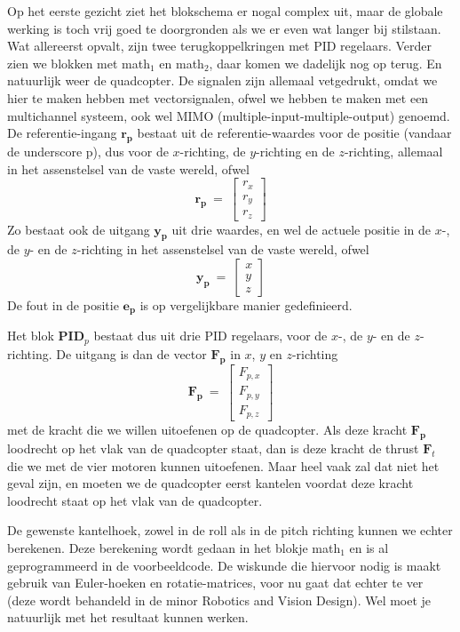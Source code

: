 \documentclass[a4paper,11pt]{article}
\begin{document}
Op het eerste gezicht ziet het blokschema er
nogal complex uit, maar de globale werking is toch vrij goed te doorgronden als
we er even wat langer bij stilstaan.
Wat allereerst opvalt, zijn twee terugkoppelkringen met
PID regelaars. Verder zien we blokken met math$_1$  en math$_2$, daar komen we
dadelijk nog op terug. En natuurlijk
weer de quadcopter.
De signalen zijn allemaal vetgedrukt, omdat we hier te maken hebben met
vectorsignalen, ofwel we hebben te maken met een multichannel systeem, ook wel
MIMO (multiple-input-multiple-output) genoemd. De referentie-ingang
$\mathbf{r_p}$  bestaat uit de referentie-waardes voor de positie (vandaar de
underscore p), dus voor de $x$-richting, de
$y$-richting en de $z$-richting, allemaal in het assenstelsel van de vaste
wereld, ofwel
\[
\mathbf{r_p} ~= ~ \left[\begin{array}{c}r_x\\ r_y \\ r_z\end{array}\right]
\]
Zo bestaat ook de uitgang $\mathbf{y_p}$ uit drie waardes, en wel de actuele
positie in de $x$-, de $y$- en de $z$-richting in het assenstelsel van de
vaste wereld, ofwel
\[
\mathbf{y_p}~ = ~ \left[\begin{array}{c}x\\y\\z\end{array}\right]
  \]
  De fout in de positie $\mathbf{e_p}$ is op vergelijkbare manier
  gedefinieerd. 
  
  Het blok \textbf{PID$_p$} bestaat dus uit drie PID regelaars,
  voor de $x$-, de $y$- en de $z$-richting. De uitgang is dan de vector
  $\mathbf{F_p}$ in $x$, $y$ en $z$-richting
  \[
  \mathbf{F_p}~ = ~ \left[\begin{array}{c}F_{p,x}\\ F_{p,y} \\ F_{p,z}\end{array}\right]
  \]
  met de kracht die we willen uitoefenen op de quadcopter. Als deze kracht
  $\mathbf{F_p}$ 
  loodrecht op het vlak van de quadcopter staat, dan is deze kracht de thrust
  $\mathbf{F}_t$ die we met de vier motoren kunnen uitoefenen. Maar heel vaak
  zal dat niet het geval zijn, en moeten we de quadcopter eerst kantelen
  voordat deze kracht loodrecht staat op het vlak van de quadcopter.

  De gewenste kantelhoek, zowel in de roll als in de pitch richting kunnen we
  echter berekenen. Deze berekening wordt gedaan in het blokje math$_1$ en is
  al geprogrammeerd in de voorbeeldcode. De wiskunde die hiervoor nodig is
maakt gebruik van
  Euler-hoeken en rotatie-matrices, voor nu gaat dat echter te ver (deze wordt
  behandeld in de minor Robotics and Vision Design). Wel moet je natuurlijk
  met het resultaat kunnen werken.
\end{document}
